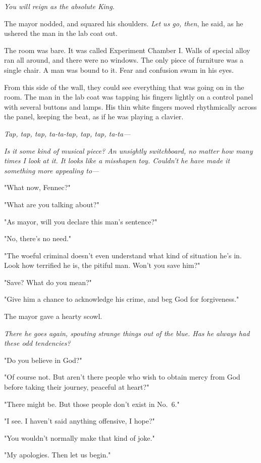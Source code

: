 \emph{You will reign as the absolute King.}

The mayor nodded, and squared his shoulders. \emph{Let us go, then}, he said,
as he ushered the man in the lab coat out.

The room was bare. It was called Experiment Chamber I. Walls of special
alloy ran all around, and there were no windows. The only piece of
furniture was a single chair. A man was bound to it. Fear and confusion
swam in his eyes.

From this side of the wall, they could see everything that was going on
in the room. The man in the lab coat was tapping his fingers lightly on
a control panel with several buttons and lamps. His thin white fingers
moved rhythmically across the panel, keeping the beat, as if he was
playing a clavier.

\emph{Tap, tap, tap, ta-ta-tap, tap, tap, ta-ta---}

\emph{Is it some kind of musical piece? An unsightly switchboard, no matter
how many times I look at it. It looks like a misshapen toy. Couldn't he
have made it something more appealing to---}

"What now, Fennec?"

"What are you talking about?"

"As mayor, will you declare this man's sentence?"

"No, there's no need."

"The woeful criminal doesn't even understand what kind of situation he's
in. Look how terrified he is, the pitiful man. Won't you save him?"

"Save? What do you mean?"

"Give him a chance to acknowledge his crime, and beg God for
forgiveness."

The mayor gave a hearty scowl.

\emph{There he goes again, spouting strange things out of the blue. Has he
always had these odd tendencies?}

"Do you believe in God?"

"Of course not. But aren't there people who wish to obtain mercy from
God before taking their journey, peaceful at heart?"

"There might be. But those people don't exist in No.~6."

"I see. I haven't said anything offensive, I hope?"

"You wouldn't normally make that kind of joke."

"My apologies. Then let us begin."

